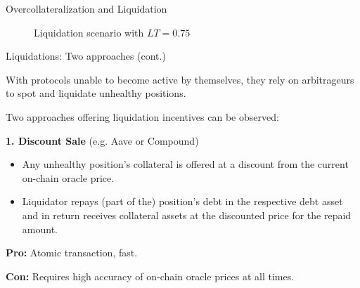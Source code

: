 \documentclass[handout]{beamer}
\begin{document}
\begin{frame}{Overcollateralization and Liquidation}

\begin{figure}[t]
	\centering
	\begin{tikzpicture}[scale=0.5, every node/.style={scale=0.8}]
		
	\end{tikzpicture}
	\caption{Liquidation scenario with $LT = 0.75$}
\end{figure}

	
\end{frame}


\begin{frame}{Liquidations: Two approaches (cont.)}

With protocols unable to become active by themselves, they rely on arbitrageurs to spot and liquidate unhealthy positions.

\vspace{1 em}
Two approaches offering liquidation incentives can be observed: 

\vspace{1 em}
\textbf{1. Discount Sale} (e.g. Aave or Compound)
\vspace{0.2em}
\begin{itemize}
\item Any unhealthy position’s collateral is offered at a discount from the current on-chain oracle price.
\item Liquidator repays (part of the) position’s debt in the respective debt asset and in return receives collateral assets at the discounted price for the repaid amount.
\end{itemize}

\vspace{0.5em}
\textbf{Pro:} Atomic transaction, fast.

\textbf{Con:} Requires high accuracy of on-chain oracle prices at all times.





	
\end{frame}
\end{document}
